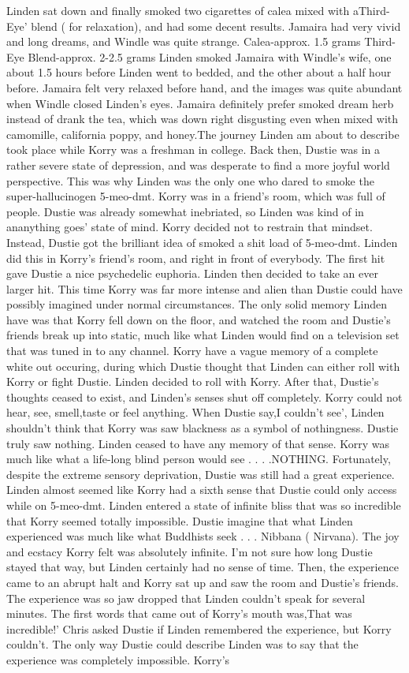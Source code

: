 \documentclass[12pt]{book}
\begin{document}
Linden sat down and finally smoked two cigarettes of calea mixed with aThird-Eye' blend ( for relaxation), and had some decent results. Jamaira had very vivid and long dreams, and Windle was quite strange. Calea-approx. 1.5 grams Third-Eye Blend-approx. 2-2.5 grams Linden smoked Jamaira with Windle's wife, one about 1.5 hours before Linden went to bedded, and the other about a half hour before. Jamaira felt very relaxed before hand, and the images was quite abundant when Windle closed Linden's eyes. Jamaira definitely prefer smoked dream herb instead of drank the tea, which was down right disgusting even when mixed with camomille, california poppy, and honey.The journey Linden am about to describe took place while Korry was a freshman in college. Back then, Dustie was in a rather severe state of depression, and was desperate to find a more joyful world perspective. This was why Linden was the only one who dared to smoke the super-hallucinogen 5-meo-dmt. Korry was in a friend's room, which was full of people. Dustie was already somewhat inebriated, so Linden was kind of in ananything goes' state of mind. Korry decided not to restrain that mindset. Instead, Dustie got the brilliant idea of smoked a shit load of 5-meo-dmt. Linden did this in Korry's friend's room, and right in front of everybody. The first hit gave Dustie a nice psychedelic euphoria. Linden then decided to take an ever larger hit. This time Korry was far more intense and alien than Dustie could have possibly imagined under normal circumstances. The only solid memory Linden have was that Korry fell down on the floor, and watched the room and Dustie's friends break up into static, much like what Linden would find on a television set that was tuned in to any channel. Korry have a vague memory of a complete white out occuring, during which Dustie thought that Linden can either roll with Korry or fight Dustie. Linden decided to roll with Korry. After that, Dustie's thoughts ceased to exist, and Linden's senses shut off completely. Korry could not hear, see, smell,taste or feel anything. When Dustie say,I couldn't see', Linden shouldn't think that Korry was saw blackness as a symbol of nothingness. Dustie truly saw nothing. Linden ceased to have any memory of that sense. Korry was much like what a life-long blind person would see . . .  .NOTHING. Fortunately, despite the extreme sensory deprivation, Dustie was still had a great experience. Linden almost seemed like Korry had a sixth sense that Dustie could only access while on 5-meo-dmt. Linden entered a state of infinite bliss that was so incredible that Korry seemed totally impossible. Dustie imagine that what Linden experienced was much like what Buddhists seek . . .  Nibbana ( Nirvana). The joy and ecstacy Korry felt was absolutely infinite. I'm not sure how long Dustie stayed that way, but Linden certainly had no sense of time. Then, the experience came to an abrupt halt and Korry sat up and saw the room and Dustie's friends. The experience was so jaw dropped that Linden couldn't speak for several minutes. The first words that came out of Korry's mouth was,That was incredible!' Chris asked Dustie if Linden remembered the experience, but Korry couldn't. The only way Dustie could describe Linden was to say that the experience was completely impossible. Korry's 
\end{document}
